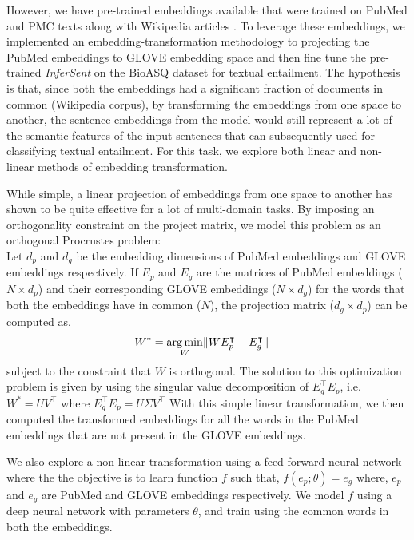 However, we have pre-trained embeddings available that were trained on PubMed and PMC texts along with Wikipedia articles \cite{biomed_embed}. To leverage these embeddings, we implemented an embedding-transformation methodology to projecting the PubMed embeddings to GLOVE embedding space and then fine tune the pre-trained \textit{InferSent} on the BioASQ dataset for textual entailment. The hypothesis is that, since both the embeddings had a significant fraction of documents in common (Wikipedia corpus), by transforming the embeddings from one space to another, the sentence embeddings from the model would still represent a lot of the semantic features of the input sentences that can subsequently used for classifying textual entailment. For this task, we explore both linear and non-linear methods of embedding transformation.

While simple, a linear projection of embeddings from one space to another has shown to be quite effective for a lot of multi-domain tasks. By imposing an orthogonality constraint on the project matrix, we model this problem as an orthogonal Procrustes problem: \\
Let $d_p$ and $d_g$ be the embedding dimensions of PubMed embeddings and GLOVE embeddings respectively.
If $E_p$ and $E_g$ are the matrices of PubMed embeddings ($N \times d_p$) and their corresponding GLOVE embeddings ($N \times d_g$) for the words that both the embeddings have in common ($N$), the projection matrix ($d_g \times d_p$) can be computed as,
\begin{align*}
    W^* &= \operatorname*{arg\,min}_W \lVert  W E_p^{\intercal} - E_g^{\intercal} \rVert
\end{align*}
subject to the constraint that $W$ is orthogonal.
The solution to this optimization problem is given by using the singular value decomposition of $E_g^{\intercal} E_p$, i.e.$  W^* = UV^{\intercal}$ where $E_g^{\intercal} E_p = U \Sigma V^{\intercal}$
With this simple linear transformation, we then computed the transformed embeddings for all the words in the PubMed embeddings that are not present in the GLOVE embeddings. 

We also explore a non-linear transformation using a feed-forward neural network where the the objective is to learn function $f$ such that, $f(e_p; \theta) = e_g$ where, $e_p$ and $e_g$ are PubMed and GLOVE embeddings respectively. We model $f$ using a deep neural network with parameters $\theta$, and train using the common words in both the embeddings. 

